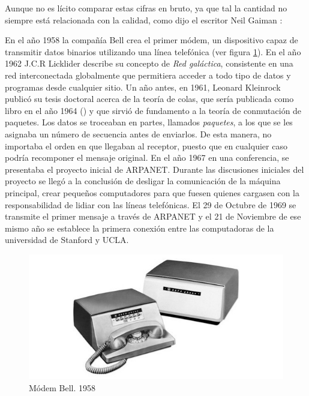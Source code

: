 Aunque no es lícito comparar estas cifras en bruto, ya que tal la cantidad no siempre está relacionada con la calidad, como dijo el escritor Neil Gaiman \cite{Gaim10}:

\vspace{5mm}
\vspace{5mm}

En el año 1958 la compañía Bell crea el primer módem, un dispositivo capaz de transmitir datos binarios utilizando una línea telefónica (ver figura \ref{fig:bell_modem}). En el año 1962 J.C.R Licklider describe su concepto de \textit{Red galáctica}, consistente en una red interconectada globalmente que permitiera acceder a todo tipo de datos y programas desde cualquier sitio. Un año antes, en 1961, Leonard Kleinrock publicó su tesis doctoral acerca de la teoría de colas, que sería publicada como libro en el año 1964 (\cite{Klei64}) y que sirvió de fundamento a la teoría de conmutación de paquetes. Los datos se troceaban en partes, llamados \textit{paquetes}, a los que se les asignaba un número de secuencia antes de enviarlos. De esta manera, no importaba el orden en que llegaban al receptor, puesto que en cualquier caso podría recomponer el mensaje original.
En el año 1967 en una conferencia, se presentaba el proyecto inicial de \ac{ARPANET}. Durante las discusiones iniciales del proyecto se llegó a la conclusión de desligar la comunicación de la máquina principal, crear pequeños computadores para que fuesen quienes cargasen con la responsabilidad de lidiar con las líneas telefónicas. El 29 de Octubre de 1969 se transmite el primer mensaje a través de \ac{ARPANET} y el 21 de Noviembre de ese mismo año se establece la primera conexión entre las computadoras de la universidad de Stanford y \ac{UCLA}. 

\begin{figure}[h!btp]
\centering
\includegraphics[scale=0.5, fbox={\fboxrule} 4mm]{images/03-antecedentes/09-modem_bell.jpg}
\caption{Módem Bell. 1958}
\label{fig:bell_modem}
\end{figure}

